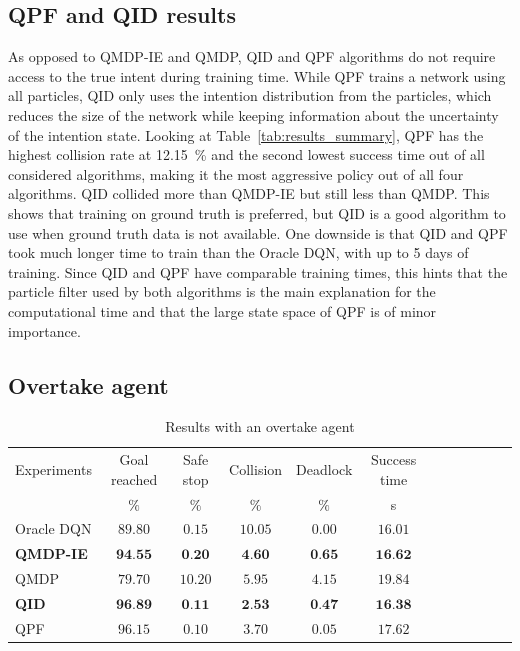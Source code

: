 \subsection{QPF and QID results}
As opposed to QMDP-IE and QMDP, QID and QPF algorithms do not require access to the true intent during training time. While QPF trains a network using all particles, QID only uses the intention distribution from the particles, which reduces the size of the network while keeping information about the uncertainty of the intention state. 
Looking at Table~\ref{tab:results_summary}, QPF has the highest collision rate at \SI{12.15}{\percent} and the second lowest success time out of all considered algorithms, making it the most aggressive policy out of all four algorithms. 
QID collided more than QMDP-IE but still less than QMDP. This shows that training on ground truth is preferred, but QID is a good algorithm to use when ground truth data is not available. 
One downside is that QID and QPF took much longer time to train than the Oracle DQN, with up to 5 days of training. Since QID and QPF have comparable training times, this hints that the particle filter used by both algorithms is the main explanation for the computational time and that the large state space of QPF is of minor importance.


\subsection{Overtake agent}
\begin{table}[h]
\caption{Results with an overtake agent}
\label{tab:results_overtake}
\begin{tabularx}{\columnwidth}{@{}l*{10}{c}c@{}}
\toprule
Experiments & Goal reached & Safe stop & Collision & Deadlock & Success time \\ 
     & $\%$ & $\%$ & $\%$ & $\%$ & s \\ 
\midrule
Oracle DQN & $89.80$ & $0.15$ & $10.05$ & $0.00$ & $16.01$ \\ 
\textbf{QMDP-IE} & $\textbf{94.55}$ & $\textbf{0.20}$ & $\textbf{4.60}$ & $\textbf{0.65}$ & $\textbf{16.62}$ \\ 
QMDP & $79.70$ & $10.20$ & $5.95$ & $4.15$ & $19.84$ \\ 
\textbf{QID} & $\textbf{96.89}$ & $\textbf{0.11}$ & $\textbf{2.53}$ & $\textbf{0.47}$ & $\textbf{16.38}$ \\ 
QPF & $96.15$ & $0.10$ & $3.70$ & $0.05$ & $17.62$ \\ 
\bottomrule
\end{tabularx}
\end{table}

